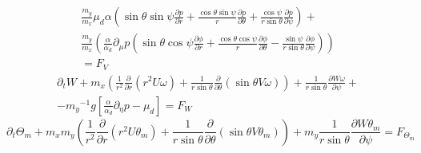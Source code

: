 \documentclass{article}
\begin{document}
\begin{sloppypar}
\begin{equation}
\begin{split}
    \frac{m_y}{m_x}{\mu_d}\alpha(\sin\theta\sin\psi\frac{\partial{p}}{\partial{r}}+\frac{\cos\theta\sin\psi}{r}\frac{\partial{p}}{\partial{\theta}}+\frac{\cos\psi}{r\sin\theta}\frac{\partial{p}}{\partial{\psi}})+ \\
    \frac{m_y}{m_x}(\frac{\alpha}{\alpha_d}\partial_{\mu}p(\sin\theta\cos\psi\frac{\partial{\phi}}{\partial{r}}+\frac{\cos\theta\cos\psi}{r}\frac{\partial{\phi}}{\partial{\theta}}-\frac{\sin\psi}{r\sin\theta}\frac{\partial{\phi}}{\partial{\psi}})) \\
    =F_{V}
    \end{split}
\end{equation}
\begin{equation}
    \begin{split}
    \partial_t{W}+
    m_x(\frac{1}{r^2}\frac{\partial}{\partial{r}}(r^2U\omega)+\frac{1}{r\sin\theta}\frac{\partial}{\partial\theta}(\sin\theta{V\omega}))+\frac{1}{r\sin\theta}\frac{\partial{W\omega}}{\partial{\psi}}+ \\
    -{{m_y}^{-1}}g[\frac{\alpha}{\alpha_{d}}\partial_{\eta}p-\mu_{d}]
    =F_{W}
    \end{split}
\end{equation}
\begin{equation}
    \partial_t{\Theta_m}+{m_x}{m_y}(\frac{1}{r^2}\frac{\partial}{\partial{r}}(r^2U\theta_m)+\frac{1}{r\sin\theta}\frac{\partial}{\partial\theta}(\sin\theta{V\theta_m}))+m_y\frac{1}{r\sin\theta}\frac{\partial{W\theta_m}}{\partial{\psi}}=F_{\Theta_m}
\end{equation}

\end{sloppypar}
\end{document}
